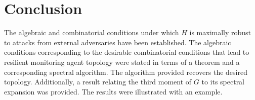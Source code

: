 \documentclass[reqno,8pt]{amsart}
\theoremstyle{definition}
\theoremstyle{remark}
\numberwithin{equation}{section}
\begin{document}

\section{Conclusion} \label{sec:sec5}
The algebraic and combinatorial conditions under which $H$ is maximally robust to attacks from external adversaries have been established. The algebraic conditions corresponding to the desirable combinatorial conditions that lead to resilient monitoring agent topology were stated in terms of a theorem and a corresponding spectral algorithm. The algorithm provided recovers the desired topology. Additionally, a result relating the third moment of $G$ to its spectral expansion was provided. The results were illustrated with an example. 




\end{document}
